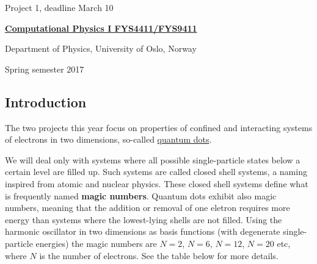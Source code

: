\documentclass[%
oneside,                 %
final,                   %
10pt]{article}
\begin{document}

\newcommand{\exercisesection}[1]{\subsection*{#1}}






\thispagestyle{empty}

\begin{center}
{\LARGE\bf
\begin{spacing}{1.25}
Project 1, deadline  March 10 
\end{spacing}
}
\end{center}


\begin{center}
{\bf \href{{http://www.uio.no/studier/emner/matnat/fys/FYS4411/index-eng.html}}{Computational Physics I FYS4411/FYS9411}}
\end{center}

    \begin{center}
\centerline{{\small Department of Physics, University of Oslo, Norway}}
\end{center}
    

\begin{center}
Spring semester 2017
\end{center}

\vspace{1cm}


\subsection{Introduction}

The two projects this year focus on properties of confined and interacting systems of electrons in two dimensions, so-called \href{{http://journals.aps.org/rmp/abstract/10.1103/RevModPhys.74.1283}}{quantum dots}.

We will deal only with systems where all possible single-particle states below a certain level are filled up. Such systems are called closed shell systems, a naming inspired from atomic and nuclear physics. These closed shell systems define what is frequently named \textbf{magic numbers}. Quantum dots exhibit also magic numbers, meaning that the addition or removal of one eletron requires more energy than systems where the lowest-lying shells are not filled. Using the harmonic oscillator in two dimensions as basis functions (with degenerate single-particle energies) the magic numbers are $N=2$, $N=6$, $N=12$, $N=20$ etc, where $N$ is the number of electrons. See the table below for more details. 
\end{document}
